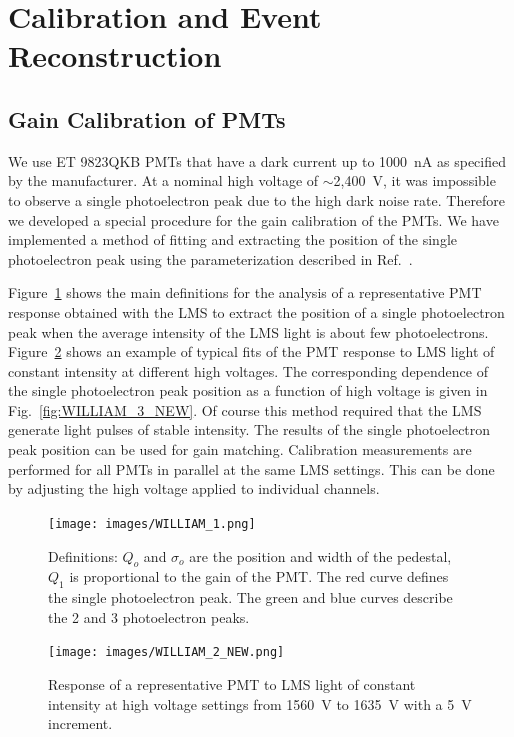 \section{Calibration and Event Reconstruction}

\subsection{Gain Calibration of PMTs} 

We use ET 9823QKB PMTs that have a dark current up to 1000~nA as specified by the manufacturer. At a
nominal high voltage of $\sim$2,400~V, it was impossible to observe a single photoelectron peak due to the
high dark noise rate. Therefore we developed a special procedure for the gain calibration of the PMTs. We
have implemented a method of fitting and extracting the position of the single photoelectron peak using the
parameterization described in Ref.~\cite{bellamy1996}.

Figure~\ref{fig:WILLIAM_1} shows the main definitions for the analysis of a representative PMT response obtained
with the LMS to extract the  position of a single photoelectron peak when the average intensity of the LMS light
is about few photoelectrons. Figure~\ref{fig:WILLIAM_2_NEW} shows an example of typical fits of the PMT
response to LMS light of constant intensity at different high voltages. The corresponding dependence of the single
photoelectron peak position as a function of high voltage is given in Fig.~\ref{fig:WILLIAM_3_NEW}. Of course
this method required that the LMS generate light pulses of stable intensity. The results of the single photoelectron
peak position can be used for gain matching. Calibration measurements are performed for all PMTs in parallel at the
same LMS settings. This can be done by adjusting the high voltage applied to individual channels.

\begin{figure}[!h]
    \centering
    \texttt{[image: images/WILLIAM\_1.png]}
    \caption{Definitions: $Q_o$ and $\sigma_o$ are the position and width of the pedestal, $Q_ 1$ is proportional
      to the gain of the PMT. The red curve defines the single photoelectron peak. The green and blue curves describe
      the 2 and 3 photoelectron peaks.}
    \label{fig:WILLIAM_1}
\end{figure}

\begin{figure}[ht]
\centering
\texttt{[image: images/WILLIAM\_2\_NEW.png]}
\caption{Response of a representative PMT to LMS light of constant intensity at high voltage settings from 1560~V
  to 1635~V with a 5~V increment.}
\label{fig:WILLIAM_2_NEW}
\end{figure}

